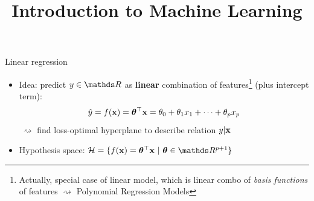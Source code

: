 \documentclass[11pt,compress,t,notes=noshow, xcolor=table]{beamer}
\title{Introduction to Machine Learning}
\institute{\href{https://compstat-lmu.github.io/lecture_i2ml/}{compstat-lmu.github.io/lecture\_i2ml}}
\date{}
\begin{document}


\begin{frame}{Linear regression}

\begin{itemize}
    \item Idea: predict $y \in \R$ as \textbf{linear} combination of 
    features\footnote[frame]{\tiny
    Actually, special case of linear model, which is linear combo of 
    \textit{basis functions} of features $\rightsquigarrow$
    Polynomial Regression Models
    }
    (plus intercept term):
    $$\hat{y} = f(\mathbf{x}) = \bm{\theta}^\top \mathbf{x} = \theta_0 + \theta_1 x_1 + \dots + \theta_p x_p$$
    $~\rightsquigarrow$ find loss-optimal hyperplane to describe relation 
    $y | \mathbf{x}$
    \item Hypothesis space: $\Hspace = \{\fx = \thx\ |\ \thetab \in \R^{p+1} \}$
    

\end{itemize}
\end{frame}
\end{document}
